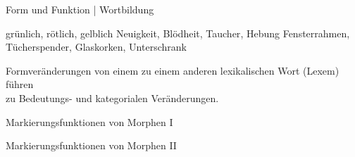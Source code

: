 \begin{frame}
  {Form und Funktion | Wortbildung}
  \pause
  \begin{exe}
    \ex grün\alert{lich}, röt\alert{lich}, gelb\alert{lich}
    \pause
    \ex Neu\alert{igkeit}, Blöd\alert{heit}, Tauch\alert{er}, Heb\alert{ung}
    \pause
    \ex Fenster\alert{rahmen}, Tücher\alert{spender}, Glas\alert{korken}, Unter\alert{schrank}
  \end{exe}
  \pause
  \Zeile
  Formveränderungen von einem zu einem anderen lexikalischen Wort (Lexem) führen\\
  zu Bedeutungs- und kategorialen Veränderungen.
\end{frame}

\begin{frame}
  {Markierungsfunktionen von Morphen I}
  \pause
  \begin{exe}
    \ex
    \begin{xlist}
    \end{xlist}
    \pause
    \ex
    \begin{xlist}
    \end{xlist}
  \end{exe}
\end{frame}

\begin{frame}
  {Markierungsfunktionen von Morphen II}
  \pause
  \begin{exe}
    \ex
    \begin{xlist}
    \end{xlist}
  \end{exe}
\end{frame}

